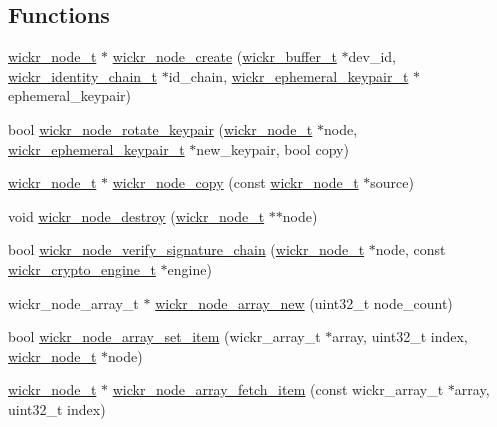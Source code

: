 \subsection*{Functions}
\begin{DoxyCompactItemize}
\item 
\hyperlink{structwickr__node}{wickr\+\_\+node\+\_\+t} $\ast$ \hyperlink{group__wickr__node_ga293b1210648e2db5449be23fe0f3e644}{wickr\+\_\+node\+\_\+create} (\hyperlink{structwickr__buffer}{wickr\+\_\+buffer\+\_\+t} $\ast$dev\+\_\+id, \hyperlink{structwickr__identity__chain}{wickr\+\_\+identity\+\_\+chain\+\_\+t} $\ast$id\+\_\+chain, \hyperlink{structwickr__ephemeral__keypair}{wickr\+\_\+ephemeral\+\_\+keypair\+\_\+t} $\ast$ephemeral\+\_\+keypair)
\item 
bool \hyperlink{group__wickr__node_ga2ed650b947df7316cf0f915805ac5aa4}{wickr\+\_\+node\+\_\+rotate\+\_\+keypair} (\hyperlink{structwickr__node}{wickr\+\_\+node\+\_\+t} $\ast$node, \hyperlink{structwickr__ephemeral__keypair}{wickr\+\_\+ephemeral\+\_\+keypair\+\_\+t} $\ast$new\+\_\+keypair, bool copy)
\item 
\hyperlink{structwickr__node}{wickr\+\_\+node\+\_\+t} $\ast$ \hyperlink{group__wickr__node_ga393c4fb42022fdc6f4336a62dbc7af91}{wickr\+\_\+node\+\_\+copy} (const \hyperlink{structwickr__node}{wickr\+\_\+node\+\_\+t} $\ast$source)
\item 
void \hyperlink{group__wickr__node_ga6acf07885403d9df6baad36a8d797f73}{wickr\+\_\+node\+\_\+destroy} (\hyperlink{structwickr__node}{wickr\+\_\+node\+\_\+t} $\ast$$\ast$node)
\item 
bool \hyperlink{group__wickr__node_gac9e2d96e9109590124b2fd05a8826c1d}{wickr\+\_\+node\+\_\+verify\+\_\+signature\+\_\+chain} (\hyperlink{structwickr__node}{wickr\+\_\+node\+\_\+t} $\ast$node, const \hyperlink{structwickr__crypto__engine}{wickr\+\_\+crypto\+\_\+engine\+\_\+t} $\ast$engine)
\item 
wickr\+\_\+node\+\_\+array\+\_\+t $\ast$ \hyperlink{group__wickr__node_ga504ebe707aa003032c4ac8044d73ee92}{wickr\+\_\+node\+\_\+array\+\_\+new} (uint32\+\_\+t node\+\_\+count)
\item 
bool \hyperlink{group__wickr__node_gae511a75489982fc2e90271be63d9d753}{wickr\+\_\+node\+\_\+array\+\_\+set\+\_\+item} (wickr\+\_\+array\+\_\+t $\ast$array, uint32\+\_\+t index, \hyperlink{structwickr__node}{wickr\+\_\+node\+\_\+t} $\ast$node)
\item 
\hyperlink{structwickr__node}{wickr\+\_\+node\+\_\+t} $\ast$ \hyperlink{group__wickr__node_ga878a3015abc8563d512c0e5acf10df60}{wickr\+\_\+node\+\_\+array\+\_\+fetch\+\_\+item} (const wickr\+\_\+array\+\_\+t $\ast$array, uint32\+\_\+t index)
$$
\end{DoxyCompactItemize}
